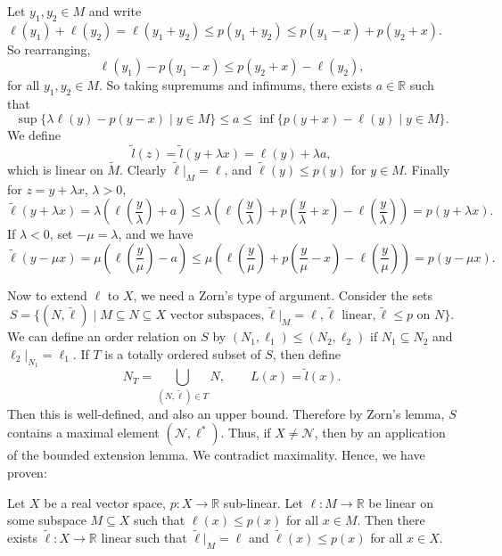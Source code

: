 \documentclass[12pt]{article}
\begin{document}
\begin{proofbox}
	Let $y_1, y_2 \in M$ and write $\ell(y_1) + \ell(y_2) = \ell(y_1 + y_2) \leq p(y_1 + y_2) \leq p(y_1 - x) + p(y_2 + x)$. So rearranging,
	\[
	\ell(y_1) - p(y_1 - x) \leq p(y_2 + x) - \ell(y_2),
	\]
	for all $y_1, y_2 \in M$. So taking supremums and infimums, there exists $a \in \mathbb{R}$ such that
	\[
		\sup\{ \lambda \ell(y) - p(y - x) \mid y \in M\} \leq a \leq \inf \{ p(y + x) - \ell(y) \mid y \in M\}.
	\]
	We define
	\[
	\tilde l(z) = \tilde l(y + \lambda x) = \ell(y) + \lambda a,
	\]
	which is linear on $\tilde M$. Clearly $\tilde \ell|_M = \ell$, and $\tilde \ell(y) \leq p(y)$ for $y \in M$. Finally for $z = y + \lambda x$, $\lambda > 0$,
	\[
	\tilde \ell(y + \lambda x) = \lambda \left( \ell \left( \frac{y}{\lambda} \right) + a \right) \leq \lambda \left( \ell \left( \frac{y}{\lambda} \right) + p \left( \frac{y}{\lambda} + x \right) - \ell \left( \frac{y}{\lambda} \right) \right) = p(y + \lambda x).
	\]
	If $\lambda < 0$, set $-\mu = \lambda$, and we have
	\[
	\tilde \ell(y - \mu x) = \mu \left( \ell \left( \frac{y}{\mu}\right) - a \right) \leq \mu \left( \ell\left( \frac{y}{\mu} \right) + p \left( \frac{y}{\mu} - x \right) - \ell \left(\frac{y}{\mu} \right) \right) = p(y - \mu x).
	\]
\end{proofbox}

Now to extend $\ell$ to $X$, we need a Zorn's type of argument. Consider the sets
\[
	S = \{ (N, \tilde \ell) \mid M \subseteq N \subseteq X \text{ vector subspaces}, \tilde \ell|_M = \ell, \tilde \ell \text{ linear}, \tilde \ell \leq p \text{ on } N\}.
\]
We can define an order relation on $S$ by $(N_1, \ell_1) \leq (N_2, \ell_2)$ if $N_1 \subseteq N_2$ and $\ell_2|_{N_1} = \ell_1$. If $T$ is a totally ordered subset of $S$, then define
\[
N_T = \bigcup_{(N, \tilde \ell) \in T} N,\qquad L(x) = \tilde l(x).
\]
Then this is well-defined, and also an upper bound. Therefore by Zorn's lemma, $S$ contains a maximal element $(\mathcal{N}, \ell^{\ast})$. Thus, if $X \neq \mathcal{N}$, then by an application of the bounded extension lemma. We contradict maximality. Hence, we have proven:

\begin{theorem}
	Let $X$ be a real vector space, $p : X \to \mathbb{R}$ sub-linear. Let $\ell : M \to \mathbb{R}$ be linear on some subspace $M \subseteq X$ such that $\ell(x) \leq p(x)$ for all $x \in M$. Then there exists $\tilde \ell : X \to \mathbb{R}$ linear such that $\tilde \ell|_M = \ell $ and $\tilde \ell(x) \leq p(x)$ for all $x \in X$.
\end{theorem}
\end{document}
